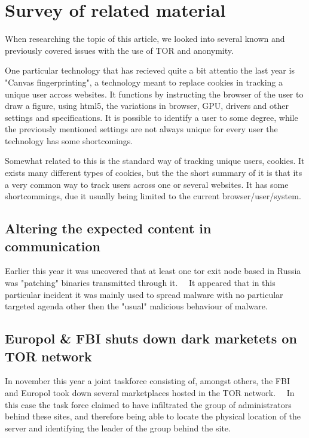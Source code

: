 \section{Survey of related material}
\label{sec:related}
When researching the topic of this article, we looked into several known and previously covered issues with the use of TOR and anonymity.

One particular technology that has recieved quite a bit attentio the last year is "Canvas fingerprinting", a technology meant to replace cookies in tracking a unique user across websites. It functions by instructing the browser of the user to draw a figure, using html5, the variations in browser, GPU, drivers and other settings and specifications. It is possible to identify a user to some degree, while the previously mentioned settings are not always unique for every user the technology has some shortcomings.~\cite{wiki_canvas}

Somewhat related to this is the standard way of tracking unique users, cookies.
It exists many different types of cookies, but the the short summary of it is that its a very common way to track users across one or several websites. It has some shortcommings, due it usually being limited to the current browser/user/system.~\cite{wiki_cookie}

\subsection{Altering the expected content in communication} %
Earlier this year it was uncovered that at least one tor exit node based in Russia was "patching" binaries transmitted through it.~\cite{fsecapt}~\cite{lev_bin_apt}
It appeared that in this particular incident it was mainly used to spread malware with no particular targeted agenda other then the "usual" malicious behaviour of malware.


\subsection{Europol \& FBI shuts down dark marketets on TOR network}

In november this year a joint taskforce consisting of, amongst others, the FBI and Europol took down several marketplaces hosted in the TOR network.~\cite{wired_tor_bust}~\cite{euro_tor_bust}
In this case the task force claimed to have infiltrated the group of administrators behind these sites, and therefore being able to locate the physical location of the server and identifying the leader of the group behind the site.
